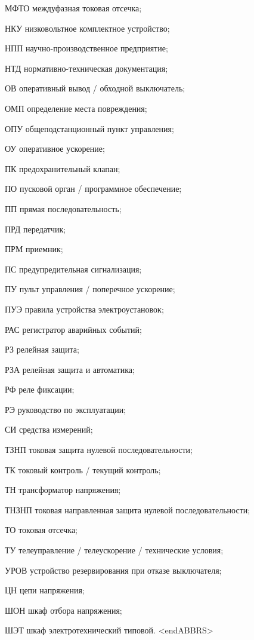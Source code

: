 \begin{list}{}
\item[МФТО] междуфазная токовая отсечка;
\item[НКУ] низковольтное комплектное устройство;
\item[НПП] научно-производственное предприятие;
\item[НТД] нормативно-техническая документация;
\item[ОВ] оперативный вывод / обходной выключатель;
\item[ОМП] определение места повреждения;
\item[ОПУ] общеподстанционный пункт управления;
\item[ОУ] оперативное ускорение;
\item[ПК] предохранительный клапан;
\item[ПО] пусковой орган / программное обеспечение;
\item[ПП] прямая последовательность;
\item[ПРД] передатчик;
\item[ПРМ] приемник;
\item[ПС] предупредительная сигнализация;
\item[ПУ] пульт управления / поперечное ускорение;
\item[ПУЭ] правила устройства электроустановок;
\item[РАС] регистратор аварийных событий;
\item[РЗ] релейная защита;
\item[РЗА] релейная защита и автоматика;
\item[РФ] реле фиксации;
\item[РЭ] руководство по эксплуатации;
\item[СИ] средства измерений;
\item[ТЗНП] токовая защита нулевой последовательности;
\item[ТК] токовый контроль / текущий контроль;
\item[ТН] трансформатор напряжения;
\item[ТНЗНП] токовая направленная защита нулевой последовательности;
\item[ТО] токовая отсечка;
\item[ТУ] телеуправление / телеускорение / технические условия;
\item[УРОВ] устройство резервирования при отказе выключателя;
\item[ЦН] цепи напряжения;
\item[ШОН] шкаф отбора напряжения;
\item[ШЭТ] шкаф электротехнический типовой.
{\color{white}\fontsize{0.1pt}{0.1pt}\selectfont<endABBRS>}
\end{list}
